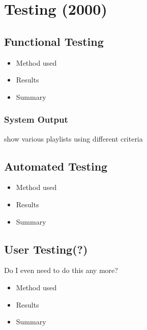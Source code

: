 \chapter{Testing (2000)}
\section{Functional Testing}
\begin{itemize}
	\item Method used
	\item Results
	\item Summary
\end{itemize}
\subsection{System Output}
show various playlists using different criteria
\section{Automated Testing}
\begin{itemize}
	\item Method used
	\item Results
	\item Summary
\end{itemize}
\section{User Testing(?)}
Do I even need to do this any more?
\begin{itemize}
	\item Method used
	\item Results
	\item Summary
\end{itemize}